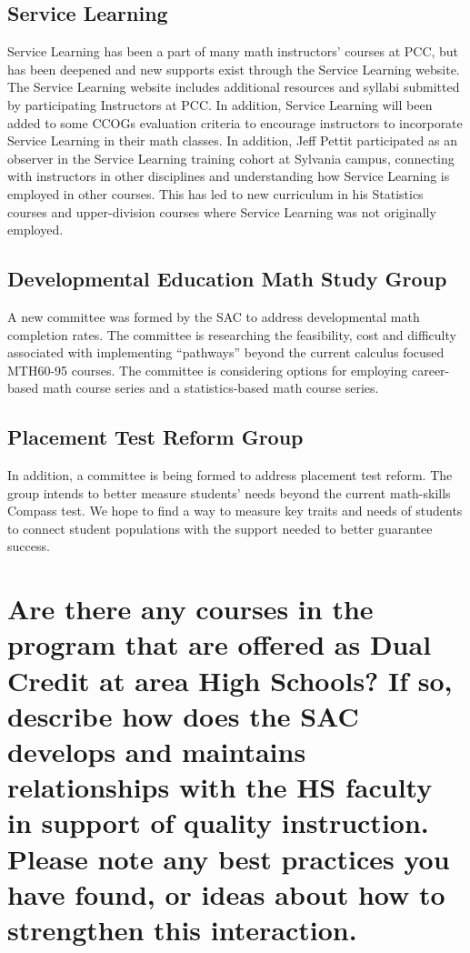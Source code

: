 \subsection{Service Learning}
Service Learning has been a part of many math instructors' courses at PCC, but has been deepened and new supports exist through the Service Learning website. The Service Learning website includes additional resources and syllabi submitted by participating Instructors at PCC. In addition, Service Learning will been added to some CCOGs evaluation criteria to encourage instructors to incorporate Service Learning in their math classes. In addition, Jeff Pettit participated as an observer in the Service Learning training cohort at Sylvania campus, connecting with instructors in other disciplines and understanding how Service Learning is employed in other courses. This has led to new curriculum in his Statistics courses and upper-division courses where Service Learning was not originally employed.

\subsection{Developmental Education Math Study Group}
A new committee was formed by the SAC to address developmental math completion rates. The committee is researching the feasibility, cost and difficulty associated with implementing ``pathways'' beyond the current calculus focused MTH60-95 courses. The committee is considering options for employing career-based math course series and a statistics-based math course series.

\subsection{Placement Test Reform Group}
In addition, a committee is being formed to address placement test reform. The group intends to better measure students' needs beyond the current math-skills Compass test. We hope to find a way to measure key traits and needs of students to connect student populations with the support needed to better guarantee success.

\section[Present dual credit relationships]{Are there any courses in the program that are offered as Dual Credit at area High Schools?  If so, describe how does the SAC develops and maintains relationships with the HS faculty in support of quality instruction. Please note any best practices you have found, or ideas about how to strengthen this interaction.  }

